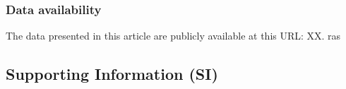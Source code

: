 \documentclass[9pt,twocolumn,twoside]{pnas-new}
\begin{document}
\subsubsection*{Data availability} The data presented in this article are publicly available at this URL: XX.
ras
\subsection*{Supporting Information (SI)}

\end{document}
